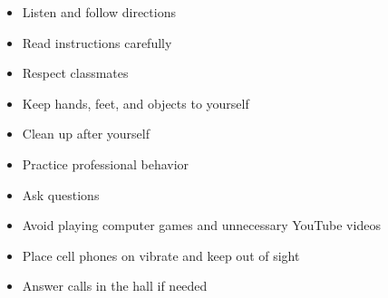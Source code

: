 \begin{itemize}
    \item Listen and follow directions
    \item Read instructions carefully
    \item Respect classmates
    \item Keep hands, feet, and objects to yourself
    \item Clean up after yourself
    \item Practice professional behavior
    \item Ask questions
    \item Avoid playing computer games and unnecessary YouTube videos
    \item Place cell phones on vibrate and keep out of sight
    \item Answer calls in the hall if needed
\end{itemize}
